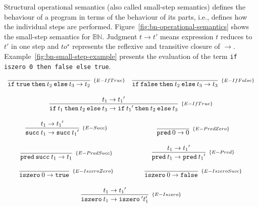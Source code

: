 Structural operational semantics\cite{plotkin1981-operational-semantics} (also
called small-step semantics) defines the behaviour of a program in terms of the
behaviour of its parts, i.e., defines how the individual steps are performed.
Figure~\ref{fig:bn-operational-semantics} shows the small-step semantics for
\(\mathbb{B}\mathbb{N}\). Judgment \(t \to t'\) means expression \(t\) reduces
to \(t'\) in one step and \(to^\star\) represents the reflexive and transitive
closure of \(\to\). Example~\ref{fig:bn-small-step-example} presents the
evaluation of the term \texttt{if iszero 0 then false else true}.

\begin{figure*}[!h]
    \[
        \begin{array}{cc}
            \infer[_{\{E-IfTrue\}}]{\texttt{if}\:\texttt{true}\:\texttt{then}\:t_2\:\texttt{else}\:t_3 \to t_2}{}
            &
            \infer[_{\{E-IfFalse\}}]{\texttt{if}\:\texttt{false}\:\texttt{then}\:t_2\:\texttt{else}\:t_3 \to t_3}{}
            \\ \\
            \multicolumn{2}{c}{
                \infer[_{\{E-IfTrue\}}]{
                    \texttt{if}\:t_1\:\texttt{then}\:t_2\:\texttt{else}\:t_3
                    \to
                    \texttt{if}\:{t_1}'\:\texttt{then}\:t_2\:\texttt{else}\:t_3
                }{
                    t_1 \to {t_1}'
                }
            }
            \\ \\
            \infer[_{\{E-Succ\}}]{\texttt{succ}\:t_1 \to \texttt{succ}\:{t_1}'}{t_1 \to {t_1}'}
            &
            \infer[_{\{E-PredZero\}}]{\texttt{pred}\:0 \to 0}{}
            \\ \\
            \infer[_{\{E-PredSucc\}}]{\texttt{pred}\:\texttt{succ}\:t_1 \to t_1}{}
            &
            \infer[_{\{E-Pred\}}]{\texttt{pred}\:t_1 \to \texttt{pred}\:{t_1}'}{t_1 \to {t_1}'}
            \\ \\
            \infer[_{\{E-IszeroZero\}}]{\texttt{iszero}\:0 \to \texttt{true}}{}
            &
            \infer[_{\{E-IszeroSucc\}}]{\texttt{iszero}\:0 \to \texttt{false}}{}
            \\ \\
            \multicolumn{2}{c}{
                \infer[_{\{E-Iszero\}}]{\texttt{iszero}\:t_1 \to \texttt{iszero}\:{'t_1'}}{{t_1 \to {t_1}'}}
            }
        \end{array}
    \]
    \centering
    \caption{Structural operational semantics for \(\mathbb{B}\mathbb{N}\)}
    \label{fig:bn-operational-semantics}
\end{figure*}

